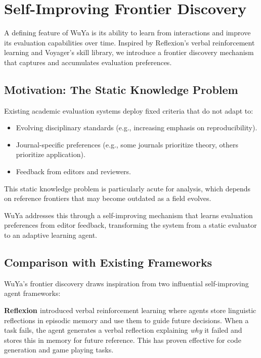 \section{Self-Improving Frontier Discovery}
\label{sec:frontier}

A defining feature of WuYa is its ability to learn from interactions and improve its evaluation capabilities over time. Inspired by Reflexion's verbal reinforcement learning and Voyager's skill library, we introduce a frontier discovery mechanism that captures and accumulates evaluation preferences.

\subsection{Motivation: The Static Knowledge Problem}

Existing academic evaluation systems deploy fixed criteria that do not adapt to:
\begin{itemize}
    \item Evolving disciplinary standards (e.g., increasing emphasis on reproducibility).
    \item Journal-specific preferences (e.g., some journals prioritize theory, others prioritize application).
    \item Feedback from editors and reviewers.
\end{itemize}

This static knowledge problem is particularly acute for \dea{} analysis, which depends on reference frontiers that may become outdated as a field evolves.

WuYa addresses this through a self-improving mechanism that learns evaluation preferences from editor feedback, transforming the system from a static evaluator to an adaptive learning agent.

\subsection{Comparison with Existing Frameworks}

WuYa's frontier discovery draws inspiration from two influential self-improving agent frameworks:

\textbf{Reflexion \citep{shinn2023reflexion}} introduced verbal reinforcement learning where agents store linguistic reflections in episodic memory and use them to guide future decisions. When a task fails, the agent generates a verbal reflection explaining \textit{why} it failed and stores this in memory for future reference. This has proven effective for code generation and game playing tasks.


